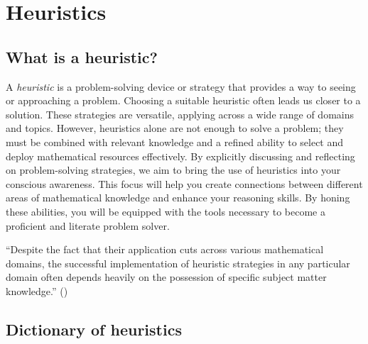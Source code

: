 \documentclass[
  a4paper,
  DIV=11,
  numbers=noendperiod,
  oneside]{scrreprt}
\begin{document}
\chapter{Heuristics}\label{sec-heuristics}

\section{What is a heuristic?}\label{what-is-a-heuristic}

A \emph{heuristic} is a problem-solving device or strategy that provides
a way to seeing or approaching a problem. Choosing a suitable heuristic
often leads us closer to a solution. These strategies are versatile,
applying across a wide range of domains and topics. However, heuristics
alone are not enough to solve a problem; they must be combined with
relevant knowledge and a refined ability to select and deploy
mathematical resources effectively. By explicitly discussing and
reflecting on problem-solving strategies, we aim to bring the use of
heuristics into your conscious awareness. This focus will help you
create connections between different areas of mathematical knowledge and
enhance your reasoning skills. By honing these abilities, you will be
equipped with the tools necessary to become a proficient and literate
problem solver.

\begin{tcolorbox}[enhanced jigsaw, toprule=.15mm, left=2mm, colbacktitle=quarto-callout-warning-color!10!white, colframe=quarto-callout-warning-color-frame, toptitle=1mm, leftrule=.75mm, arc=.35mm, rightrule=.15mm, opacityback=0, coltitle=black, bottomrule=.15mm, title=\textcolor{quarto-callout-warning-color}{\faExclamationTriangle}\hspace{0.5em}{Heuristics will not replace shaky mastery of a subject!}, colback=white, titlerule=0mm, bottomtitle=1mm, breakable, opacitybacktitle=0.6]

``Despite the fact that their application cuts across various
mathematical domains, the successful implementation of heuristic
strategies in any particular domain often depends heavily on the
possession of specific subject matter knowledge.''
()

\end{tcolorbox}

\section{Dictionary of heuristics}\label{dictionary-of-heuristics}
\end{document}
